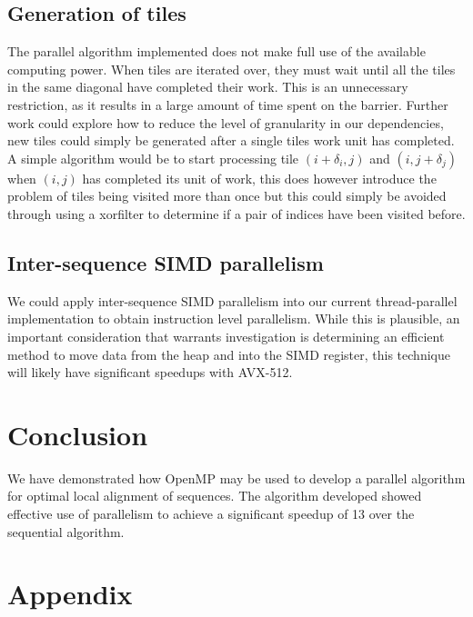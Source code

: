 \documentclass[manuscript,screen, nonacm=true]{acmart}
\begin{document}
\subsection{Generation of tiles}
The parallel algorithm implemented does not make full use of the available computing power. When tiles are iterated over, they must wait until all the tiles in the same diagonal have completed their work. This is an unnecessary restriction, as it results in a large amount of time spent on the barrier.
Further work could explore how to reduce the level of granularity in our dependencies, new tiles could simply be generated after a single tiles work unit has completed. A simple algorithm would be to start processing tile $(i+\delta_i,j)$ and $(i,j+\delta_j)$ when $(i,j)$ has completed its unit of work, this does however introduce the problem of tiles being visited more than once but this could simply be avoided through using a xorfilter to determine if a pair of indices have been visited before.

\subsection{Inter-sequence SIMD parallelism}
We could apply inter-sequence SIMD parallelism into our current thread-parallel implementation to obtain instruction level parallelism. 
While this is plausible, an important consideration that warrants investigation is determining an efficient method to move data from the heap and into the SIMD register, this technique will likely have significant speedups with AVX-512. 

\section{Conclusion}
We have demonstrated how OpenMP may be used to develop a parallel algorithm for optimal local alignment of sequences. The algorithm developed showed effective use of parallelism to achieve a significant speedup of 13 over the sequential algorithm. 

\nocite{lameter2013overview}






\appendix
\section{Appendix}


\end{document}
